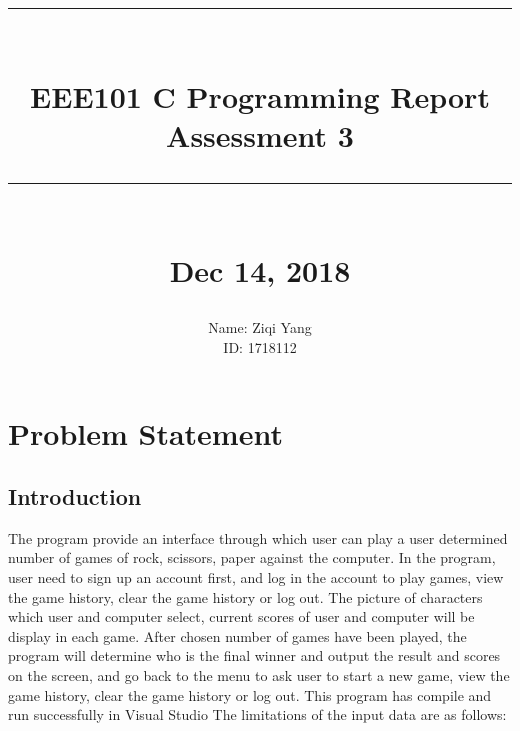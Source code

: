 \documentclass[12pt]{article}
\newcommand{\HRule}[1]{\rule{\linewidth}{#1}}
\begin{document}
	
	\title{ \normalsize \textsc{}
		\\ [2.0cm]
		\HRule{0.5pt} \\
		\LARGE \textbf{EEE101 C Programming Report\\Assessment 3}
		\HRule{2pt} \\ [0.5cm]
		\normalsize Dec 14, 2018 \vspace*{5\baselineskip}}
	
	\date{}
	
	\author{
		Name: Ziqi Yang\\
		ID: 1718112\\
	}
	
	\maketitle
	\newpage
	\tableofcontents
	\newpage
	
	
	\section{Problem Statement}
	
	\subsection{Introduction}
	The program provide an interface through which user can play a user determined number of games of rock, scissors, paper against the computer. In the program, user need to sign up an account first, and log in the account to play games, view the game history, clear the game history or log out. The picture of characters which user and computer select, current scores of user and computer will be display in each game. After chosen number of games have been played, the program will determine who is the final winner and output the result and scores on the screen, and go back to the menu to ask user to start a new game, view the game history, clear the game history or log out. This program has compile and run successfully in Visual Studio The limitations of the input data are as follows:
	
\end{document}
